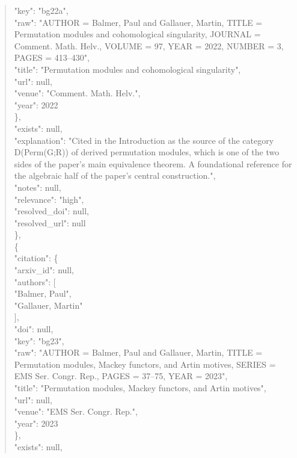 \documentclass[11pt]{article}
\begin{document}
\begin{quote}
        "key": "bg22a",\\
        "raw": "AUTHOR = Balmer, Paul and Gallauer, Martin, TITLE = Permutation modules and cohomological singularity, JOURNAL = Comment. Math. Helv., VOLUME = 97, YEAR = 2022, NUMBER = 3, PAGES = 413--430",\\
        "title": "Permutation modules and cohomological singularity",\\
        "url": null,\\
        "venue": "Comment. Math. Helv.",\\
        "year": 2022\\
      \},\\
      "exists": null,\\
      "explanation": "Cited in the Introduction as the source of the category D(Perm(G;R)) of derived permutation modules, which is one of the two sides of the paper's main equivalence theorem. A foundational reference for the algebraic half of the paper's central construction.",\\
      "notes": null,\\
      "relevance": "high",\\
      "resolved\_doi": null,\\
      "resolved\_url": null\\
    \},\\
    \{\\
      "citation": \{\\
        "arxiv\_id": null,\\
        "authors": [\\
          "Balmer, Paul",\\
          "Gallauer, Martin"\\
        ],\\
        "doi": null,\\
        "key": "bg23",\\
        "raw": "AUTHOR = Balmer, Paul and Gallauer, Martin, TITLE = Permutation modules, Mackey functors, and Artin motives, SERIES = EMS Ser. Congr. Rep., PAGES = 37--75, YEAR = 2023",\\
        "title": "Permutation modules, Mackey functors, and Artin motives",\\
        "url": null,\\
        "venue": "EMS Ser. Congr. Rep.",\\
        "year": 2023\\
      \},\\
      "exists": null,\\

\end{quote}
\end{document}

